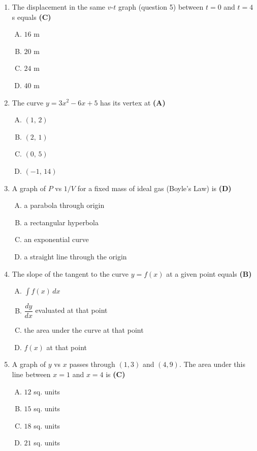 \documentclass[10pt,a4paper]{article}
\begin{document}
\begin{enumerate}[1.]
\item The displacement in the same $v$-$t$ graph (question 5) between $t=0$ and $t=4$ s equals \hfill \textbf{(C)}
\begin{enumerate}[(A)]
    \item $16$ m
    \item $20$ m
    \item $24$ m
    \item $40$ m
\end{enumerate}

\item The curve $y = 3x^2 - 6x + 5$ has its vertex at \hfill \textbf{(A)}
\begin{enumerate}[(A)]
    \item $(1,\,2)$
    \item $(2,\,1)$
    \item $(0,\,5)$
    \item $(-1,\,14)$
\end{enumerate}

\item A graph of $P$ vs $1/V$ for a fixed mass of ideal gas (Boyle's Law) is \hfill \textbf{(D)}
\begin{enumerate}[(A)]
    \item a parabola through origin
    \item a rectangular hyperbola
    \item an exponential curve
    \item a straight line through the origin
\end{enumerate}

\item The slope of the tangent to the curve $y = f(x)$ at a given point equals \hfill \textbf{(B)}
\begin{enumerate}[(A)]
    \item $\displaystyle\int f(x)\,dx$
    \item $\dfrac{dy}{dx}$ evaluated at that point
    \item the area under the curve at that point
    \item $f(x)$ at that point
\end{enumerate}

\item A graph of $y$ vs $x$ passes through $(1, 3)$ and $(4, 9)$. The area under this line between $x=1$ and $x=4$ is \hfill \textbf{(C)}
\begin{enumerate}[(A)]
    \item $12$ sq. units
    \item $15$ sq. units
    \item $18$ sq. units
    \item $21$ sq. units
\end{enumerate}


\end{enumerate}
\end{document}
